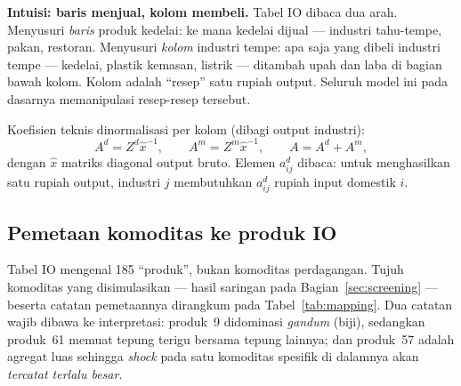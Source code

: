 \documentclass[11pt,a4paper]{article}
\newcommand{\en}[1]{\textit{#1}}   %
\begin{document}
\begin{intuisi}
\textbf{Intuisi: baris menjual, kolom membeli.} Tabel IO dibaca dua arah.
Menyusuri \emph{baris} produk kedelai: ke mana kedelai dijual --- industri
tahu-tempe, pakan, restoran. Menyusuri \emph{kolom} industri tempe: apa
saja yang dibeli industri tempe --- kedelai, plastik kemasan, listrik ---
ditambah upah dan laba di bagian bawah kolom. Kolom adalah ``resep'' satu
rupiah output. Seluruh model ini pada dasarnya memanipulasi resep-resep
tersebut.
\end{intuisi}

Koefisien teknis dinormalisasi per kolom (dibagi output industri):
\begin{equation}
A^{d} = Z^{d} \hat{x}^{-1}, \qquad
A^{m} = Z^{m} \hat{x}^{-1}, \qquad
A = A^{d} + A^{m},
\end{equation}
dengan $\hat{x}$ matriks diagonal output bruto. Elemen $a^{d}_{ij}$ dibaca:
untuk menghasilkan satu rupiah output, industri $j$ membutuhkan
$a^{d}_{ij}$ rupiah input domestik $i$.

\subsection{Pemetaan komoditas ke produk IO}
\label{sec:mapping}

Tabel IO mengenal 185 ``produk'', bukan komoditas perdagangan. Tujuh
komoditas yang disimulasikan --- hasil saringan pada
Bagian~\ref{sec:screening} --- beserta catatan pemetaannya dirangkum pada
Tabel~\ref{tab:mapping}. Dua catatan wajib dibawa ke interpretasi:
produk~9 didominasi \emph{gandum} (biji), sedangkan produk~61 memuat
tepung terigu bersama tepung lainnya; dan produk~57 adalah agregat luas
sehingga \en{shock} pada satu komoditas spesifik di dalamnya akan
\emph{tercatat terlalu besar}.
\end{document}
